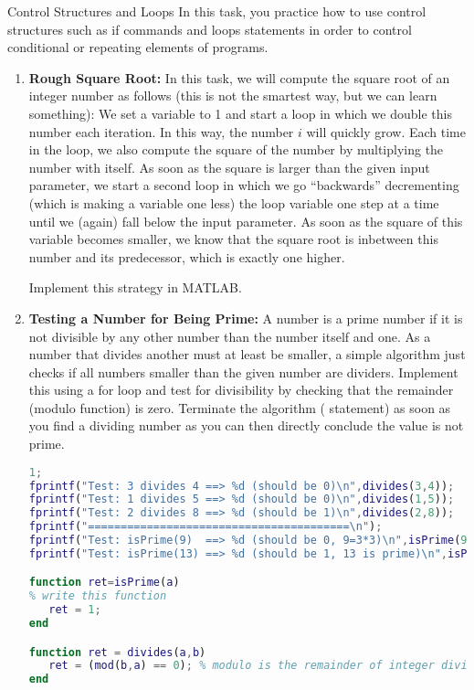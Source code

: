\begin{task}{Control Structures and Loops}{}{}
In this task, you practice how to use control structures such as if commands and loops statements in order to control conditional or repeating elements of programs.

\begin{enumerate}
\item{\textbf{Rough Square Root:}
  In this task, we will compute the square root of an integer number as follows (this is
  not the smartest way, but we can learn something): We set a variable to 1 and start a
  loop in which we double this number each iteration. In this way, the number $i$ will
  quickly grow. Each time in the loop, we also compute the square of the number by multiplying
  the number with itself. As soon as the square is larger than the given input parameter, we
  start a second loop in which we go ``backwards'' decrementing (which is making a variable
  one less) the loop variable one step at a time until we (again) fall below the input parameter.
  As soon as the square of this variable becomes smaller, we know that the square root is inbetween this number and its predecessor, which is exactly one higher.

  Implement this strategy in MATLAB.
}
\item{\textbf{Testing a Number for Being Prime:} A number is a prime number if it is not
  divisible by any other number than the number itself and one. As a number that divides another must at least be smaller, a simple algorithm just checks if all numbers smaller than the given number are dividers. Implement this using a for loop and test for divisibility by checking that the remainder (modulo function) is zero. Terminate the algorithm ( statement) as soon as you find a dividing number as you can then directly conclude the value is not prime.

  \begin{lstlisting}[language=MATLAB]
1;
fprintf("Test: 3 divides 4 ==> %d (should be 0)\n",divides(3,4));
fprintf("Test: 1 divides 5 ==> %d (should be 0)\n",divides(1,5));
fprintf("Test: 2 divides 8 ==> %d (should be 1)\n",divides(2,8));
fprintf("========================================\n");
fprintf("Test: isPrime(9)  ==> %d (should be 0, 9=3*3)\n",isPrime(9));
fprintf("Test: isPrime(13) ==> %d (should be 1, 13 is prime)\n",isPrime(13));

function ret=isPrime(a)
% write this function
   ret = 1;  
end

function ret = divides(a,b)
   ret = (mod(b,a) == 0); % modulo is the remainder of integer division
end
  \end{lstlisting}
}


\end{enumerate}
\end{task}
